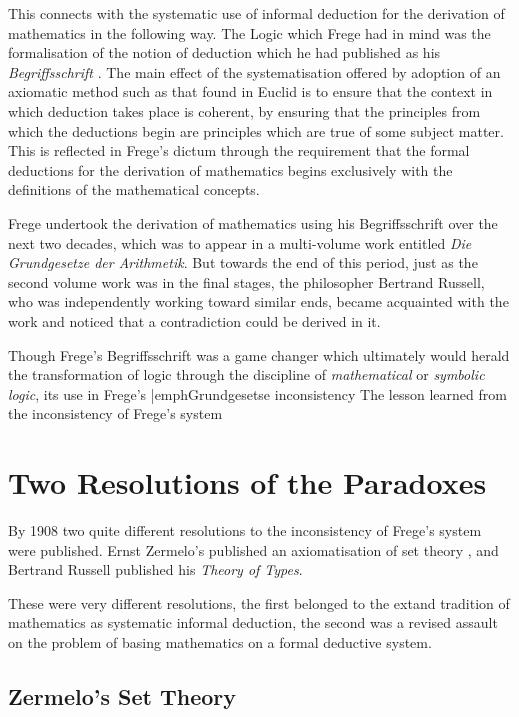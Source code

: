 \documentclass[10pt,titlepage]{book}
\begin{document}
This connects with the systematic use of informal deduction for the derivation of mathematics in the following way.
The Logic which Frege had in mind was the formalisation of the notion of deduction which he had published as his \emph{Begriffsschrift} \cite{frege79}.
The main effect of the systematisation offered by adoption of an axiomatic method such as that found in Euclid is to ensure that the context in which deduction takes place is coherent, by ensuring that the principles from which the deductions begin are principles which are true of some subject matter.
This is reflected in Frege's dictum through the requirement that the formal deductions for the derivation of mathematics begins exclusively with the definitions of the mathematical concepts.

Frege undertook the derivation of mathematics using his Begriffsschrift over the next two decades, which was to appear in a multi-volume work entitled \emph{Die Grundgesetze der Arithmetik}\cite{frege93}.
But towards the end of this period, just as the second volume work was in the final stages, the philosopher Bertrand Russell, who was independently working toward similar ends, became acquainted with the work and noticed that a contradiction could be derived in it.

Though Frege's Begriffsschrift was a game changer which ultimately would herald the transformation of logic through the discipline of \emph{mathematical} or \emph{symbolic logic}, its use in Frege's |emph{Grundgesetse} inconsistency 
The lesson learned from the inconsistency of Frege's system

\section{Two Resolutions of the Paradoxes}

By 1908 two quite different resolutions to the inconsistency of Frege's system were published.
Ernst Zermelo's published an axiomatisation of set theory \cite{zermelo08}, and Bertrand Russell published his \emph{Theory of Types}\cite{heijenoort67,russell1908}.

These were very different resolutions, the first belonged to the extand tradition of mathematics as systematic informal deduction, the second was a revised assault on the problem of basing mathematics on a formal deductive system.

\subsection{Zermelo's Set Theory}
\end{document}
